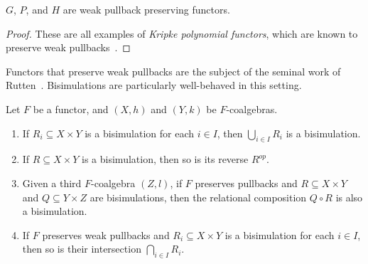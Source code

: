 \documentclass[orivec,envcountsect,envcountsame]{llncs}
\begin{document}
\begin{definition}

\end{definition}

\begin{lemma}
	\(G\), \(P\), and \(H\) are weak pullback preserving functors.
\end{lemma}

\begin{proof}
	These are all examples of \emph{Kripke polynomial functors}, which are known to preserve weak pullbacks~\cite{gummelements}.
\end{proof}

Functors that preserve weak pullbacks are the subject of the seminal work of Rutten~\cite{coalgebra}.
Bisimulations are particularly well-behaved in this setting.

\begin{lemma}\label{lem:general bisim facts}
	Let \(F\) be a functor, and \((X, h)\) and \((Y, k)\) be \(F\)-coalgebras.
	\begin{enumerate}
		\item If \(R_i \subseteq X \times Y\) is a bisimulation for each \(i \in I\), then \(\bigcup_{i \in I} R_i\) is a bisimulation.
		\item If \(R \subseteq X \times Y\) is a bisimulation, then so is its reverse \(R^{op}\).
		\item Given a third \(F\)-coalgebra \((Z, l)\), if \(F\) preserves pullbacks and \(R \subseteq X \times Y\) and \(Q \subseteq Y \times Z\) are bisimulations, then the relational composition \(Q \circ R\) is also a bisimulation.
		\item If \(F\) preserves weak pullbacks and \(R_i \subseteq X \times Y\) is a bisimulation for each \(i \in I\), then so is their intersection \(\bigcap_{i \in I} R_i\).
	\end{enumerate}
\end{lemma}
\end{document}

